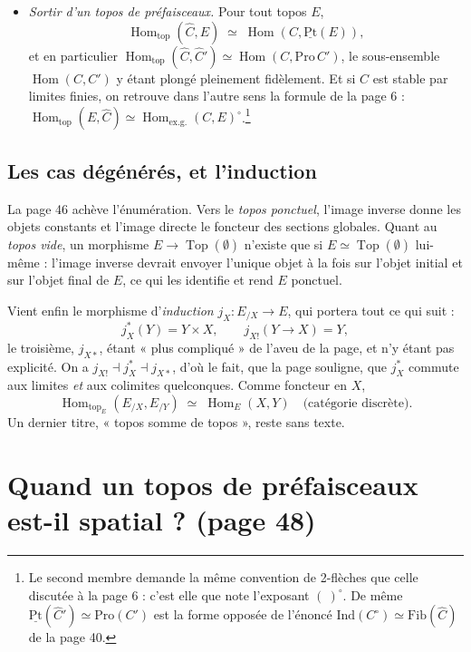 \documentclass[11pt,a4paper]{article}
\begin{document}
\begin{itemize}
\item \emph{Sortir d'un topos de préfaisceaux.} Pour tout topos $E$,
\[
\operatorname{Hom}_{\mathrm{top}}(\widehat{C}, E) \;\simeq\;
\operatorname{Hom}(C, \underline{\mathrm{Pt}}(E)),
\]
et en particulier
$\operatorname{Hom}_{\mathrm{top}}(\widehat{C}, \widehat{C}') \simeq
\operatorname{Hom}(C, \mathrm{Pro}\,C')$, le sous-ensemble
$\operatorname{Hom}(C,C')$ y étant plongé pleinement fidèlement. Et si $C$ est
stable par limites finies, on retrouve dans l'autre sens la formule de la page 6 :
$\operatorname{Hom}_{\mathrm{top}}(E, \widehat{C}) \simeq
\operatorname{Hom}_{\mathrm{ex.g.}}(C, E)^{\circ}$.\footnote{Le second membre
demande la même convention de 2-flèches que celle discutée à la page 6 :
c'est elle que note l'exposant $(\ )^{\circ}$. De même
$\underline{\mathrm{Pt}}(\widehat{C}') \simeq \mathrm{Pro}(C')$ est la forme
opposée de l'énoncé $\mathrm{Ind}(C^{\circ}) \simeq \mathrm{Fib}(\widehat{C})$
de la page 40.}
\end{itemize}

\subsection*{Les cas dégénérés, et l'induction}

La page 46 achève l'énumération. Vers le \emph{topos ponctuel}, l'image inverse
donne les objets constants et l'image directe le foncteur des sections
globales. Quant au \emph{topos vide}, un morphisme $E \to
\operatorname{Top}(\emptyset)$ n'existe que si $E \simeq
\operatorname{Top}(\emptyset)$ lui-même : l'image inverse devrait envoyer
l'unique objet à la fois sur l'objet initial et sur l'objet final de $E$, ce
qui les identifie et rend $E$ ponctuel.

Vient enfin le morphisme d'\emph{induction} $j_{X} : E_{/X} \to E$, qui portera
tout ce qui suit :
\[
j_{X}^{*}(Y) = Y \times X, \qquad
j_{X!}(Y \to X) = Y,
\]
le troisième, $j_{X*}$, étant « plus compliqué » de l'aveu de la page, et
n'y étant pas explicité. On a $j_{X!} \dashv j_{X}^{*} \dashv j_{X*}$, d'où le fait, que la page
souligne, que $j_{X}^{*}$ commute aux limites \emph{et} aux colimites
quelconques. Comme foncteur en $X$,
\[
\operatorname{Hom}_{\mathrm{top}_{E}}(E_{/X}, E_{/Y}) \;\simeq\;
\operatorname{Hom}_{E}(X,Y) \quad \text{(catégorie discrète)}.
\]
Un dernier titre, « topos somme de topos », reste sans texte.

\section*{Quand un topos de préfaisceaux est-il spatial ? (page 48)}
\end{document}
